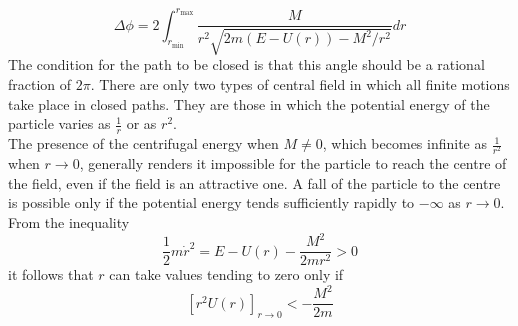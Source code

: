 \[\Delta \phi = 2 \int_{r_{\mathrm{min}}}^{r_{\mathrm{max}}} \frac{M}{r^2 \sqrt{2m(E-U(r))-M^2/r^2}} dr\]
The condition for the path to be closed is that this angle should be a rational fraction of $2\pi$. There are only two types of central field in which all finite motions take place in closed paths. They are those in which the potential energy of the particle varies as $\frac{1}{r}$ or as $r^2$.\\
The presence of the centrifugal energy when $M \neq 0$, which becomes infinite as $\frac{1}{r^2}$ when $r \to 0$, generally renders it impossible for the particle to reach the centre of the field, even if the field is an attractive one. 
A fall of the particle to the centre is possible only if the potential energy tends sufficiently rapidly to $-\infty$ as $r \to 0$. From the inequality
\[\frac{1}{2} m\dot{r}^2 = E - U(r) - \frac{M^2}{2mr^2} > 0\]
it follows that $r$ can take values tending to zero only if
\[[r^2 U(r)]_{r\to 0} < -\frac{M^2}{2m}\]

